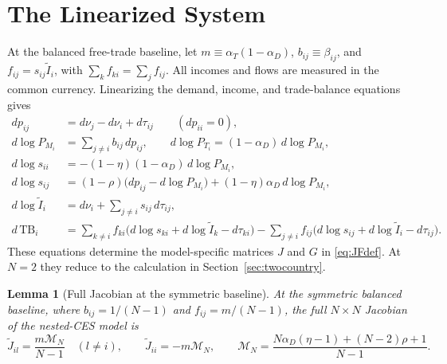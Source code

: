 \documentclass[11pt]{article}
\newtheorem{lemma}[theorem]{Lemma}
\begin{document}
\appendix

\section{The Linearized System}

\label{app:linear}

At the balanced free-trade baseline, let $m\equiv\alpha_T(1-\alpha_D)$, $b_{ij}\equiv\beta_{ij}$, and $f_{ij}=s_{ij}\widetilde I_i$, with $\sum_k f_{ki}=\sum_j f_{ij}$. All incomes and flows are measured in the common currency. Linearizing the demand, income, and trade-balance equations gives
\begin{align}
dp_{ij} &= d\nu_j-d\nu_i+d\tau_{ij} \qquad (dp_{ii}=0), \label{eq:dp}\\
d\log P_{M_i} &= \sum_{j\neq i}b_{ij}\,dp_{ij}, \qquad
d\log P_{T_i}=(1-\alpha_D)\,d\log P_{M_i}, \label{eq:dindex}\\
d\log s_{ii} &= -(1-\eta)(1-\alpha_D)\,d\log P_{M_i},\\
d\log s_{ij} &= (1-\rho)\big(dp_{ij}-d\log P_{M_i}\big)
+(1-\eta)\alpha_D\,d\log P_{M_i}, \label{eq:dsfor}\\
d\log\widetilde I_i &= d\nu_i+\sum_{j\neq i}s_{ij}\,d\tau_{ij},\\
d\,\mathrm{TB}_i &= \sum_{k\neq i}f_{ki}\big(d\log s_{ki}+d\log\widetilde I_k-d\tau_{ki}\big)
-\sum_{j\neq i}f_{ij}\big(d\log s_{ij}+d\log\widetilde I_i-d\tau_{ij}\big).
\label{eq:dtb}
\end{align}
These equations determine the model-specific matrices $J$ and $G$ in \eqref{eq:JFdef}. At $N=2$ they reduce to the calculation in Section~\ref{sec:twocountry}.

\begin{lemma}[Full Jacobian at the symmetric baseline]
At the symmetric balanced baseline, where $b_{ij}=1/(N-1)$ and $f_{ij}=m/(N-1)$, the full $N\times N$ Jacobian of the nested-CES model is
\begin{equation}
\widetilde J_{il} = \frac{m\mathcal M_N}{N-1}
\quad
(l\neq i),
\qquad
\widetilde J_{ii} = -m\mathcal M_N,
\qquad
\mathcal M_N = \frac{N\alpha_D(\eta-1)+(N-2)\rho+1}{N-1}.
\label{eq:full-jacobian}
\end{equation}
\end{lemma}
\end{document}
